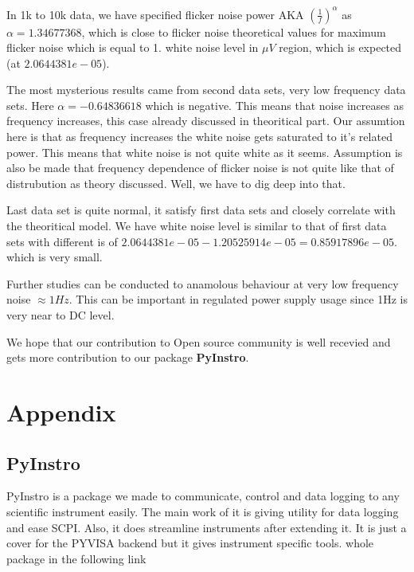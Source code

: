\documentclass[12pt]{article}
\begin{document}
In 1k to 10k data, we have specified flicker noise power AKA $(\frac{1}{f})^{\alpha}$ as $\alpha = 1.34677368$, which is close to flicker noise theoretical values for maximum flicker noise which is equal to 1. white noise level in $\mu V$ region, which is expected (at $2.0644381e-05$). 


The most mysterious results came from second data sets, very low frequency data sets. Here  $\alpha= -0.64836618$ which is negative. This means that noise increases as frequency increases, this case already discussed in theoritical part. Our assumtion here is that as frequency increases the white noise gets saturated to it’s related power. This means that white noise is not quite white as it seems. Assumption is also be made that frequency dependence of flicker noise is not quite like that of distrubution as theory discussed. Well, we have to dig deep into that.

Last data set is quite normal, it satisfy first data sets and closely correlate with the theoritical model. We have white noise level is similar to that of first data sets with different is of $2.0644381e-05-1.20525914e-05 = 0.85917896e-05$. which is very small. 

Further studies can be conducted to anamolous behaviour at very low frequency noise $\approx 1Hz$. This can be important in regulated power supply usage since 1Hz is very near to DC level. 

We hope that our contribution to Open source community is well recevied and gets more contribution to our package \textbf{PyInstro}.

\clearpage






\clearpage

\section*{Appendix}

\subsection*{PyInstro}

PyInstro is a package we made to communicate, control and data logging to any scientific instrument easily. The main work of it is giving utility for data logging and ease SCPI. Also, it does streamline instruments after extending it. It is just a cover for the PYVISA backend but it gives instrument specific tools. whole package in the following link
\end{document}
